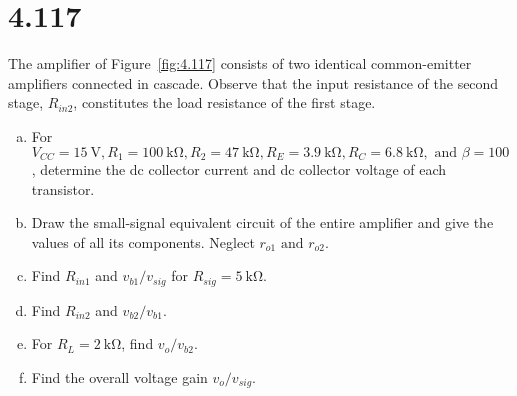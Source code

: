 \documentclass[12pt, a4paper]{article}
\begin{document}
\section{4.117}
The amplifier of Figure~\ref{fig:4.117} consists of two identical common-emitter amplifiers connected in cascade. Observe that the input resistance of the second stage, $R_{in2}$, constitutes the load resistance of the first stage.

\begin{enumerate}[(a)]
  \item For $V_{CC} = \SI{15}{\V}, R_1 = \SI{100}{\kohm}, R_2 = \SI{47}{\kohm}, R_E = \SI{3.9}{\kohm}, R_C = \SI{6.8}{\kohm}, \text{ and } \beta = 100$, determine the dc collector current and dc collector voltage of each transistor.
  \item Draw the small-signal equivalent circuit of the entire amplifier and give the values of all its components. Neglect $r_{o1} \text{ and } r_{o2}$.
  \item Find $R_{in1}$ and $v_{b1}/v_{sig}$ for $R_{sig} = \SI{5}{\kohm}$.
  \item Find $R_{in2}$ and $v_{b2}/v_{b1}$.
  \item For $R_L = \SI{2}{\kohm}$, find $v_o / v_{b2}$.
  \item Find the overall voltage gain $v_o / v_{sig}$.
\end{enumerate}
\end{document}
